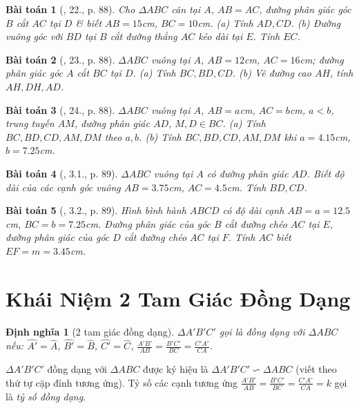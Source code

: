 \documentclass{article}
\newtheorem{baitoan}{Bài toán}
\newtheorem{dinhnghia}{Định nghĩa}
\begin{document}
\begin{baitoan}[\cite{SBT_Toan_8_tap_2}, 22., p. 88]
	Cho $\Delta ABC$ cân tại $A$, $AB = AC$, đường phân giác góc $B$ cắt $AC$ tại $D$ \& biết $AB = 15$\emph{cm}, $BC = 10$\emph{cm}. (a) Tính $AD,CD$. (b) Đường vuông góc với $BD$ tại $B$ cắt đường thẳng $AC$ kéo dài tại $E$. Tính $EC$.
\end{baitoan}

\begin{baitoan}[\cite{SBT_Toan_8_tap_2}, 23., p. 88]
	$\Delta ABC$ vuông tại $A$, $AB = 12$\emph{cm}, $AC = 16$\emph{cm}; đường phân giác góc $A$ cắt $BC$ tại $D$. (a) Tính $BC,BD,CD$. (b) Vẽ đường cao $AH$, tính $AH,DH,AD$.
\end{baitoan}

\begin{baitoan}[\cite{SBT_Toan_8_tap_2}, 24., p. 88]
	$\Delta ABC$ vuông tại $A$, $AB = a$\emph{cm}, $AC = b$\emph{cm}, $a < b$, trung tuyến $AM$, đường phân giác $AD$, $M,D\in BC$. (a) Tính $BC,BD,CD,AM,DM$ theo $a,b$. (b) Tính $BC,BD,CD,AM,DM$ khi $a = 4.15$\emph{cm}, $b = 7.25$\emph{cm}.
\end{baitoan}

\begin{baitoan}[\cite{SBT_Toan_8_tap_2}, 3.1., p. 89]
	$\Delta ABC$ vuông tại $A$ có đường phân giác $AD$. Biết độ dài của các cạnh góc vuông $AB = 3.75$\emph{cm}, $AC = 4.5$\emph{cm}. Tính $BD,CD$.
\end{baitoan}

\begin{baitoan}[\cite{SBT_Toan_8_tap_2}, 3.2., p. 89]
	Hình bình hành $ABCD$ có độ dài cạnh $AB = a = 12.5$\emph{cm}, $BC = b = 7.25$\emph{cm}. Đường phân giác của góc $B$ cắt đường chéo $AC$ tại $E$, đường phân giác của góc $D$ cắt đường chéo $AC$ tại $F$. Tính $AC$ biết $EF = m = 3.45$\emph{cm}.
\end{baitoan}


\section{Khái Niệm 2 Tam Giác Đồng Dạng}

\begin{dinhnghia}[2 tam giác đồng dạng]
	$\Delta A'B'C'$ gọi là \emph{đồng dạng} với $\Delta ABC$ nếu: $\widehat{A'} = \widehat{A}$, $\widehat{B'} = \widehat{B}$, $\widehat{C'} = \widehat{C}$, $\frac{A'B'}{AB} = \frac{B'C'}{BC} = \frac{C'A'}{CA}$.
\end{dinhnghia}
$\Delta A'B'C'$ đồng dạng với $\Delta ABC$ được ký hiệu là $\Delta A'B'C'\backsim\Delta ABC$ (viết theo thứ tự cặp đỉnh tương ứng). Tỷ số các cạnh tương ứng $\frac{A'B'}{AB} = \frac{B'C'}{BC} = \frac{C'A'}{CA} = k$ gọi là \textit{tỷ số đồng dạng}.
\end{document}
